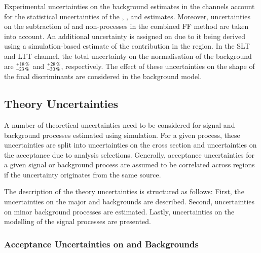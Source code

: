 Experimental uncertainties on the \faketauhadvisC background estimates in the
\lephad channels account for the statistical uncertainties of the \FFqcd,
\FFttbar, and \rqcd estimates. Moreover, uncertainties on the subtraction of
\ttbar and non-\ttbar processes in the combined FF method are taken into
account. An additional uncertainty is assigned on \rqcd due to it being derived
using a simulation-based estimate of the \ttbarFakes contribution in the \antiid
region. In the \lephad SLT and LTT channel, the total uncertainty on the
normalisation of the \faketauhadvisC background are
$^{\hspace{0.25pt}+\hspace{0.25pt}18\,\%}_{-23\,\%}$ and
$^{\hspace{0.25pt}+\hspace{0.25pt}28\,\%}_{-30\,\%}$, respectively. The effect
of these uncertainties on the shape of the final discriminants are considered in
the background model.



\subsection{Theory Uncertainties}%
\label{sec:modelling_uncertainties}%
\label{sec:theory_uncertainties}

A number of theoretical uncertainties need to be considered for signal and
background processes estimated using simulation. For a given process, these
uncertainties are split into uncertainties on the cross section and
uncertainties on the acceptance due to analysis selections. Generally,
acceptance uncertainties for a given signal or background process are assumed to
be correlated across regions if the uncertainty originates from the same source.

The description of the theory uncertainties is structured as follows: First, the
uncertainties on the major \ZHF and \ttbar backgrounds are described. Second,
uncertainties on minor background processes are estimated. Lastly, uncertainties
on the modelling of the signal processes are presented.


\subsubsection{Acceptance Uncertainties on \ZHF and \ttbar Backgrounds}


